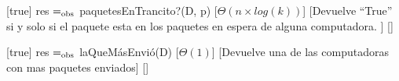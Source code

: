 \begin{Interfaz}
  [true]%
  {res $=_{\mathrm{obs}}$ paquetesEnTrancito?(D, p)}%
  [$\Theta(n \times log(k))$]%
  [Devuelve ``True'' si y solo si el paquete esta en los paquetes en espera de alguna computadora. ]%
  []%

  [true]%
  {res $=_{\mathrm{obs}}$ laQueM\'asEnvi\'o(D)}%
  [$\Theta(1)$]%
  [Devuelve una de las computadoras con mas paquetes enviados]%
  []%


\end{Interfaz}

